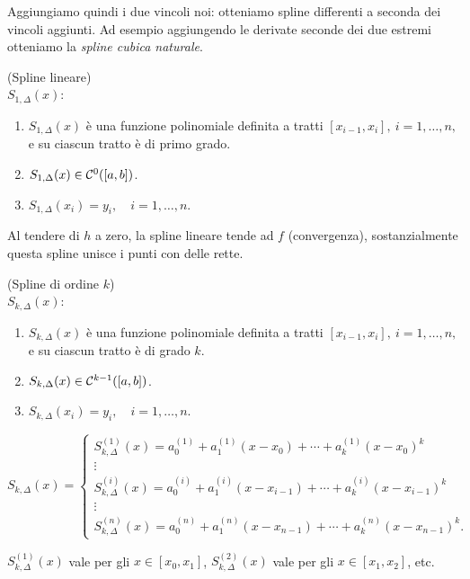 Aggiungiamo quindi i due vincoli noi: otteniamo spline differenti a seconda 
dei vincoli aggiunti. Ad esempio aggiungendo le derivate seconde dei due
estremi otteniamo la \emph{spline cubica naturale}.

\begin{defi}
(Spline lineare)\\
$S_{1,\Delta}(x)$:
\begin{enumerate}
\item $S_{1,\Delta}(x)$ è una funzione polinomiale definita a tratti
$[x_{i-1}, x_i], \ i = 1, \ldots, n,$ e su ciascun tratto è di primo grado.
\item $S_{1,\Delta}(x) \in \mathcal{C}^0([a,b])$.
\item $S_{1,\Delta}(x_i) = y_i, \quad i = 1, \ldots, n$.
\end{enumerate}
\end{defi}

Al tendere di $h$ a zero, la spline lineare tende ad $f$ (convergenza),
sostanzialmente questa spline unisce i punti con delle rette.

\begin{defi}
(Spline di ordine $k$)\\
$S_{k,\Delta}(x)$:
\begin{enumerate}
\item $S_{k,\Delta}(x)$ è una funzione polinomiale definita a tratti
$[x_{i-1}, x_i], \ i = 1, \ldots, n,$ e su ciascun tratto è di grado $k$.
\item $S_{k,\Delta}(x) \in \mathcal{C}^{k-1}([a,b])$.
\item $S_{k,\Delta}(x_i) = y_i, \quad i = 1, \ldots, n$.
\end{enumerate}
\[
S_{k,\Delta}(x) = \left \{
\begin{array}{l}
S_{k,\Delta}^{(1)}(x) = a_0^{(1)} + a_1^{(1)}(x-x_0)+ \cdots + a_k^{(1)}(x-x_0)^k \\
\vdots \\
S_{k,\Delta}^{(i)}(x) = a_0^{(i)} + a_1^{(i)}(x-x_{i-1}) + \cdots + 
a_k^{(i)}(x-x_{i-1})^k \\
\vdots \\
S_{k,\Delta}^{(n)}(x) =  a_0^{(n)} + a_1^{(n)}(x-x_{n-1}) + \cdots 
+a_k^{(n)}(x-x_{n-1})^k.
\end{array}\right.
\]
\begin{notabene}
$S_{k,\Delta}^{(1)}(x)$ vale per gli $x \in [x_0, x_1]$, 
$S_{k,\Delta}^{(2)}(x)$  vale per gli $x \in [x_1, x_2]$, etc.
\end{notabene}
\end{defi}

